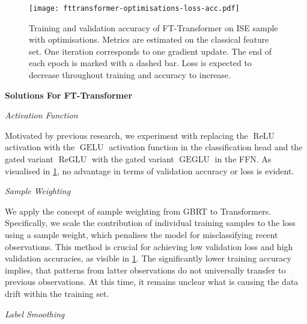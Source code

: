 \begin{figure}[!ht]
    \centering
    \texttt{[image: fttransformer-optimisations-loss-acc.pdf]}
    \caption[Training and Validation Accuracy of FT-Transformer on  with Optimisations]{Training and validation accuracy of FT-Transformer on \gls{ISE} sample with optimisations. Metrics are estimated on the classical feature set. One iteration corresponds to one gradient update. The end of each epoch is marked with a dashed bar. Loss is expected to decrease throughout training and accuracy to increase.}
    \label{fig:fttransformer-optimisations-loss-acc}
\end{figure}


\textbf{Solutions For FT-Transformer}

\emph{Activation Function}

Motivated by previous research, we experiment with replacing the $\operatorname{ReLU}$ activation with the $\operatorname{GELU}$ activation function \autocite[][2]{hendrycksGaussianErrorLinear2020} in the classification head and the gated variant $\operatorname{ReGLU}$ with the gated variant $\operatorname{GEGLU}$ \autocite[][2]{shazeerGLUVariantsImprove2020} in the \gls{FFN}. As visualised in \cref{fig:fttransformer-optimisations-loss-acc}, no advantage in terms of validation accuracy or loss is evident.

\emph{Sample Weighting}

We apply the concept of sample weighting from \gls{GBRT} to Transformers. Specifically, we scale the contribution of individual training samples to the loss using a sample weight, which penalises the model for misclassifying recent observations. This method is crucial for achieving low validation loss and high validation accuracies, as visible in \cref{fig:fttransformer-optimisations-loss-acc}. The significantly lower training accuracy implies, that patterns from latter observations do not universally transfer to previous observations. At this time, it remains unclear what is causing the data drift within the training set.

\emph{Label Smoothing}

